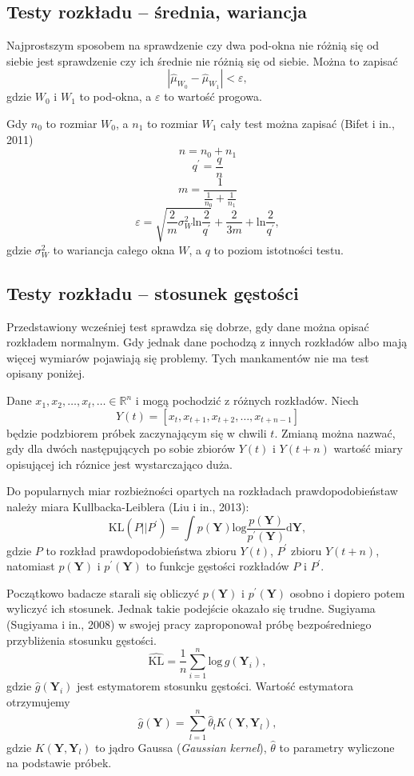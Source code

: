 \subsection{Testy rozkładu -- średnia, wariancja}
\label{sub:TestsMeanAndVar}
Najprostszym sposobem na sprawdzenie czy dwa pod-okna nie różnią się od siebie
jest sprawdzenie czy ich średnie nie różnią się od siebie.
Można to zapisać
$$ | \hat{\mu}_{W_{0}} - \hat{\mu}_{W_{1}} | < \varepsilon, $$
gdzie $W_{0}$ i $W_{1}$ to pod-okna, a $\varepsilon$ to wartość progowa.

Gdy $n_{0}$ to rozmiar $W_{0}$,
a $n_{1}$ to rozmiar $W_{1}$ cały test można zapisać (Bifet i in., 2011)
$$n = n_{0} + n_{1}$$
$$q^\prime = \frac{q}{n}$$
$$m=\frac{1}{\frac{1}{n_0}+\frac{1}{n_1}}$$
$$\varepsilon = \sqrt{\frac{2}{m} \sigma^{2}_{W} \mbox{ln}\frac{2}{q^\prime}} + \frac{2}{3m} + \mbox{ln}\frac{2}{q^\prime},$$
gdzie $\sigma^{2}_{W}$ to wariancja całego okna $W$,
a $q$ to poziom istotności testu.
\subsection{Testy rozkładu -- stosunek gęstości}
\label{sub:TestDensityRatio}
Przedstawiony wcześniej test sprawdza się dobrze,
gdy dane można opisać rozkładem normalnym.
Gdy jednak dane pochodzą z innych rozkładów albo mają więcej wymiarów pojawiają się problemy.
Tych mankamentów nie ma test opisany poniżej.

Dane $x_1,x_2,\ldots,x_t,\ldots \in \mathbb{R}^n$ i mogą pochodzić z różnych rozkładów.
Niech
$$ Y(t) = [{x_t, x_{t+1}, x_{t+2}, \ldots, x_{t+n-1}}]$$
będzie podzbiorem próbek zaczynającym się w chwili $t$.
Zmianą można nazwać,
gdy dla dwóch następujących po sobie zbiorów $Y(t)$ i $Y(t+n)$
wartość miary opisującej ich róznice jest wystarczająco duża.

Do popularnych miar rozbieżności opartych na rozkładach prawdopodobieństaw należy miara Kullbacka-Leiblera (Liu i in., 2013):
$$\mbox{KL}(P||P^\prime) = \int p(\textbf{Y}) \mbox{log}\frac{p(\textbf{Y})}{p^\prime(\textbf{Y})} \mbox{d}\textbf{Y},$$
gdzie $P$ to rozkład prawdopodobieństwa zbioru $Y(t)$,
$P^\prime$ zbioru $Y(t+n)$,
natomiast $p(\textbf{Y})$ i $p^\prime(\textbf{Y})$ to funkcje gęstości rozkładów $P$ i $P^\prime$.

Początkowo badacze starali się obliczyć $p(\textbf{Y})$ i $p^\prime(\textbf{Y})$ osobno
i dopiero potem wyliczyć ich stosunek.
Jednak takie podejście okazało się trudne.
Sugiyama (Sugiyama i in., 2008) w swojej pracy zaproponował próbę bezpośredniego przybliżenia stosunku gęstości.
$$\hat{\mbox{KL}} = \frac{1}{n} \sum\limits_{i=1}^n \mbox{log}\,\hat{g}(\textbf{Y}_i),$$
gdzie $\hat{g}(\textbf{Y}_i)$ jest estymatorem stosunku gęstości.
Wartość estymatora otrzymujemy
$$\hat{g}(\textbf{Y}) = \sum\limits_{l=1}^n \hat{\theta}_l K(\textbf{Y}, \textbf{Y}_l),$$
gdzie $K(\textbf{Y}, \textbf{Y}_l)$ to jądro Gaussa (\textit{Gaussian kernel}), $\hat{\theta}$
to parametry wyliczone na podstawie próbek.
